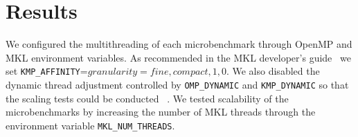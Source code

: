 
\section{Results}
%
We configured the multithreading of each microbenchmark through OpenMP and MKL
  environment variables.
As recommended in the MKL developer's guide~\cite{intel:mkl2017} we set
  \texttt{KMP\_AFFINITY}=$granularity=fine,compact,1,0$.
We also disabled the dynamic thread adjustment controlled by
  \texttt{OMP\_DYNAMIC} and \texttt{KMP\_DYNAMIC} so that the scaling tests
  could be conducted
  ~\cite{intel:cpp2015, intel:cpp2017, intel:mkl11_2, intel:mkl2017}.
We tested scalability of the microbenchmarks by increasing the number of MKL
  threads through the environment variable \texttt{MKL\_NUM\_THREADS}.

